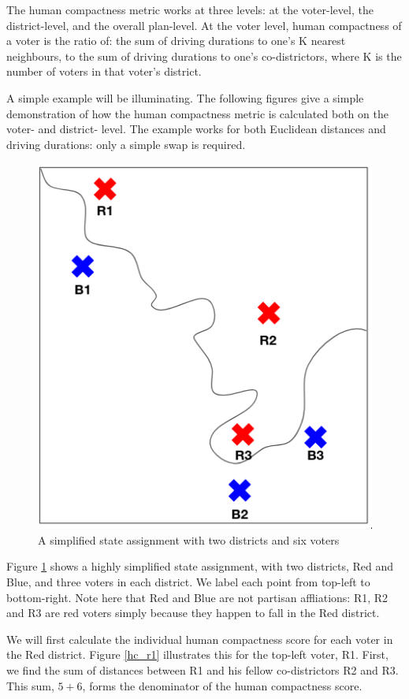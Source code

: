 \documentclass[]{article}
\begin{document}
The human compactness metric works at three levels: at the voter-level,
the district-level, and the overall plan-level. At the voter level,
human compactness of a voter is the ratio of: the sum of driving
durations to one's K nearest neighbours, to the sum of driving durations
to one's co-districtors, where K is the number of voters in that voter's
district.

A simple example will be illuminating. The following figures give a
simple demonstration of how the human compactness metric is calculated
both on the voter- and district- level. The example works for both
Euclidean distances and driving durations: only a simple swap is
required.

\begin{figure}
\centering
\includegraphics{img/human_compactness_1.png}
\caption{A simplified state assignment with two districts and six voters
\label{hc_demo}}
\end{figure}

Figure \ref{hc_demo} shows a highly simplified state assignment, with
two districts, Red and Blue, and three voters in each district. We label
each point from top-left to bottom-right. Note here that Red and Blue
are not partisan affliations: R1, R2 and R3 are red voters simply
because they happen to fall in the Red district.

We will first calculate the individual human compactness score for each
voter in the Red district. Figure \ref{hc_r1} illustrates this for the
top-left voter, R1. First, we find the sum of distances between R1 and
his fellow co-districtors R2 and R3. This sum, \(5 + 6\), forms the
denominator of the human compactness score.
\end{document}
